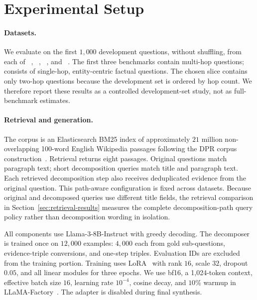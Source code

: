 \section{Experimental Setup}
\label{sec:experiments}

\paragraph{Datasets.}
We evaluate on the first \(1{,}000\) development questions, without shuffling,
from each of \hotpot{}~\citep{hotpotqa}, \twowiki{}~\citep{twowiki},
\musique{}~\citep{musique}, and \popqa{}~\citep{popqa}. The first three
benchmarks contain multi-hop questions; \popqa{} consists of single-hop,
entity-centric factual questions. The chosen \musique{} slice contains only
two-hop questions because the development set is ordered by hop count. We
therefore report these results as a controlled development-set study, not as
full-benchmark estimates.

\paragraph{Retrieval and generation.}
The corpus is an Elasticsearch BM25 index of approximately \(21\) million
non-overlapping 100-word English Wikipedia passages following the DPR corpus
construction~\citep{dpr}. Retrieval returns eight passages. Original questions
match paragraph text; short decomposition queries match title and paragraph
text. Each retrieved decomposition step also receives deduplicated evidence
from the original question. This path-aware configuration is fixed across
datasets. Because original and decomposed queries use different title fields,
the retrieval comparison in Section~\ref{sec:retrieval-results} measures the
complete decomposition-path query policy rather than decomposition wording in
isolation.

All components use Llama-3-8B-Instruct with greedy decoding. The decomposer is
trained once on \(12{,}000\) examples: \(4{,}000\) each from \musique{} gold
sub-questions, \twowiki{} evidence-triple conversions, and \popqa{} one-step
triples. Evaluation IDs are excluded from the \popqa{} training portion.
Training uses LoRA~\citep{lora} with rank \(16\), scale \(32\), dropout \(0.05\),
and all linear modules for three epochs. We use bf16, a 1,024-token context,
effective batch size \(16\), learning rate \(10^{-4}\), cosine decay, and
\(10\%\) warmup in LLaMA-Factory~\citep{llamafactory}. The adapter is disabled
during final synthesis.

